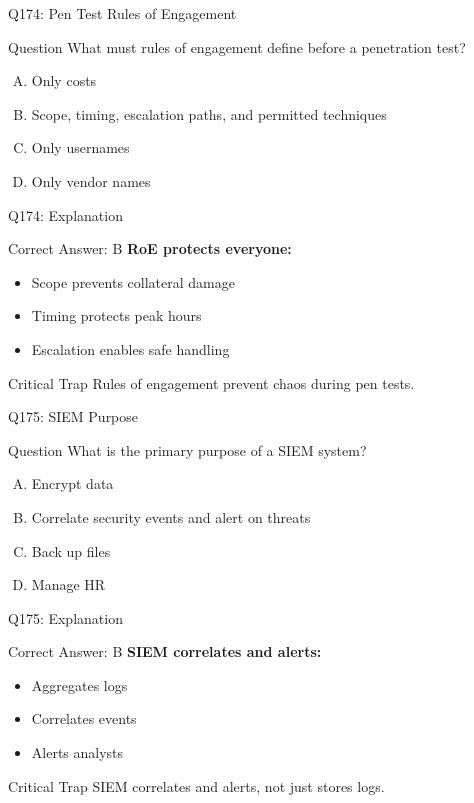 \documentclass{beamer}
\begin{document}
	\begin{frame}{Q174: Pen Test Rules of Engagement}
		\begin{block}{Question}
			What must rules of engagement define before a penetration test?
		\end{block}
		\begin{enumerate}[(A)]
			\item Only costs
			\item Scope, timing, escalation paths, and permitted techniques
			\item Only usernames
			\item Only vendor names
		\end{enumerate}
	\end{frame}
	
	\begin{frame}{Q174: Explanation}
		\begin{block}{Correct Answer: B}
			\textbf{RoE protects everyone:}
			\begin{itemize}
				\item Scope prevents collateral damage
				\item Timing protects peak hours
				\item Escalation enables safe handling
			\end{itemize}
		\end{block}
		\begin{alertblock}{Critical Trap}
			Rules of engagement prevent chaos during pen tests.
		\end{alertblock}
	\end{frame}
	
	\begin{frame}{Q175: SIEM Purpose}
		\begin{block}{Question}
			What is the primary purpose of a SIEM system?
		\end{block}
		\begin{enumerate}[(A)]
			\item Encrypt data
			\item Correlate security events and alert on threats
			\item Back up files
			\item Manage HR
		\end{enumerate}
	\end{frame}
	
	\begin{frame}{Q175: Explanation}
		\begin{block}{Correct Answer: B}
			\textbf{SIEM correlates and alerts:}
			\begin{itemize}
				\item Aggregates logs
				\item Correlates events
				\item Alerts analysts
			\end{itemize}
		\end{block}
		\begin{alertblock}{Critical Trap}
			SIEM correlates and alerts, not just stores logs.
		\end{alertblock}
	\end{frame}
	
\end{document}
